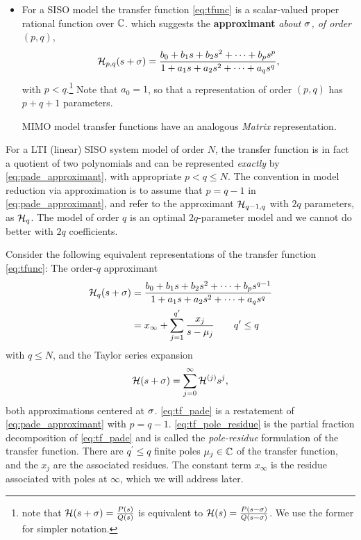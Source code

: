 \begin{itemize}
\item For a SISO model the transfer function \eqref{eq:tfunc} is a scalar-valued proper rational function over $\mathbb{C}$.   which suggests the  \textbf{\pade{} approximant} \emph{about $\sigma$, of order $(p,q)$},
\begin{align}
\tf_{p,q}(s+\xp) =  \frac{b_0 + b_1 s + b_2 s^2 +  \cdots + b_ps^p}%
		{1 + a_1 s + a_2 s^2 + \cdots + a_q s^q},
\label{eq:pade_approximant}
\end{align}
 with  $p < q$.\footnote{note that $\mathcal{H}(s+\sigma)=\frac{P(s)}{Q(s)}$ is equivalent to $\mathcal{H}(s)=\frac{P(s-\sigma)}{Q(s-\sigma)}$.  We use the former for simpler notation.} Note that $a_0=1$, so that a \pade{} representation of order $(p,q)$ has $p+q+1$ parameters.  

MIMO model transfer functions have an analogous \emph{Matrix \pade{}} representation. 
\end{itemize}

\smallskip
For a LTI (linear) SISO system model of order $N$, the transfer function is in fact a quotient of two polynomials and can be represented \emph{exactly} by \eqref{eq:pade_approximant}, with appropriate $p< q\leq N$.     The convention in model reduction via \pade{} approximation is to assume that $p=q-1$ in  \eqref{eq:pade_approximant}, and refer to the \pade{} approximant $\mathcal{H}_{q-1,q}$ with $2q$ parameters, as $\mathcal{H}_q$.    The \pade{} model of order $q$ is an optimal $2q$-parameter model and we cannot do better with $2q$ coefficients.

Consider the following equivalent representations of the transfer function  \eqref{eq:tfunc}: The order-$q$ \pade{} approximant
\begin{align}
\tf_q(s+\xp) &=  \frac{b_0 + b_1 s + b_2 s^2 +  \cdots + b_ps^{q-1}}%
		{1 + a_1 s + a_2 s^2 + \cdots + a_q s^q}\label{eq:tf_pade}\\
	&= x_\infty + \sum_{j=1}^{q^\prime} \frac{x_j}{s-\mu_j}\qquad q^\prime\leq q
\label{eq:tf_pole_residue}
\end{align} 
with $q \leq N$, and the Taylor series expansion 
\begin{equation}
\mathcal{H}(s+\sigma) = \sum_{j=0}^\infty \mathcal{H}^{(j)} s^j, 
\label{eq:tf_moments}
\end{equation}
both approximations centered at $\sigma$.
\eqref{eq:tf_pade} is a restatement of  \eqref{eq:pade_approximant} with $p=q-1$.  \eqref{eq:tf_pole_residue} is the partial fraction decomposition of \eqref{eq:tf_pade} and is called the \emph{pole-residue} formulation of the transfer function.  There are $q^\prime\leq q$  finite poles $\mu_j\in\mathbb{C}$ of the transfer function, and the $x_j$ are the associated residues.   The constant term $x_\infty$ is the residue associated with poles at $\infty$, which we will address later.  
 
